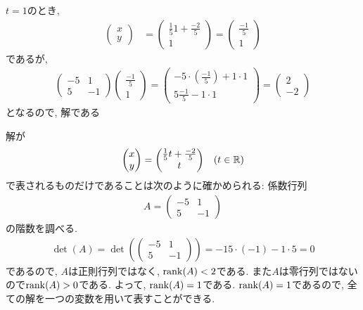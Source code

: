 \begin{checkanswer}
  $t=1$のとき,
  \begin{align*}
      \begin{pmatrix}x\\y\end{pmatrix}
        &=\begin{pmatrix}\frac{1}{5}1+\frac{-2}{5}\\1\end{pmatrix}
        =\begin{pmatrix}\frac{-1}{5}\\1\end{pmatrix}
  \end{align*}
  であるが,
  \begin{align*}
    \begin{pmatrix}-5&1\\5&-1\end{pmatrix}
      \begin{pmatrix}\frac{-1}{5}\\1\end{pmatrix}
        =
    \begin{pmatrix}-5\cdot(\frac{-1}{5})+1\cdot 1 \\5 \frac{-1}{5}-1\cdot 1 \end{pmatrix}
        =
    \begin{pmatrix}2 \\-2\end{pmatrix}
  \end{align*}
  となるので, 解である
\end{checkanswer}
\begin{checkanswer}%
  解が
  \begin{align*}
      \begin{pmatrix}x\\y\end{pmatrix}
        &=\begin{pmatrix}\frac{1}{5}t+\frac{-2}{5}\\t\end{pmatrix}
        &(t\in \mathbb{R})
  \end{align*}
  で表されるものだけであることは次のように確かめられる:
  係数行列
  \begin{align*}
    A=\begin{pmatrix}-5&1\\5&-1\end{pmatrix}
  \end{align*}
  の階数を調べる.
  \begin{align*}
    \det(A)=\det(\begin{pmatrix}-5&1\\5&-1\end{pmatrix})=-15\cdot(-1)-1\cdot 5 =0
  \end{align*}
  であるので, $A$は正則行列ではなく, 
  $\operatorname{rank}(A)<2$である. また$A$は零行列ではないので$\operatorname{rank}(A)>0$である.
  よって, $\operatorname{rank}(A)=1$である.
  $\operatorname{rank}(A)=1$であるので,
  全ての解を一つの変数を用いて表すことができる.
\end{checkanswer}

